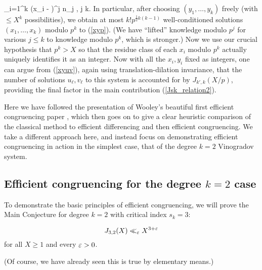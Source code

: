 \documentclass[brochure,english,12pt]{bourbaki}%
\begin{document}
\beq\label{p_classical} 
\sum_{i=1}^k (x_i - \xi)^j \con n_j ,  \leq j \leq k.
\eeq
In particular, after choosing $(y_1,\ldots, y_k)$ freely (with $ \leq X^k$ possibilities), we obtain at most $k! p^{\frac{1}{2}k(k-1)}$ well-conditioned solutions $(x_1,\ldots, x_k)$ modulo $p^k$ to (\ref{xyp}). (We have ``lifted'' knowledge modulo $p^j$ for various $j \leq k$ to knowledge modulo $p^k$, which is stronger.) Now we use our crucial hypothesis that $p^k >X$ so that the residue class of each $x_i$ modulo $p^k$ actually uniquely identifies it as an integer. 
Now with all the $x_i,y_i$ fixed as integers, one can argue from (\ref{xyuv}), again using translation-dilation invariance, that the number of solutions $u_\ell,v_\ell$ to this system is accounted for by $J_{k',k}(X/p)$, providing the final factor in the main contribution (\ref{Jsk_relation2}).





Here we have followed the presentation of Wooley's beautiful first efficient congruencing paper \cite{Woo12a}, which then goes on to give a clear heuristic comparison of the classical method to efficient differencing and then efficient congruencing. We take a different approach here, and instead focus on demonstrating efficient congruencing in action in the simplest case, that of the degree $k=2$ Vinogradov system.

\subsection{Efficient congruencing for the degree $k=2$ case}\label{sec_EC_k2}
To demonstrate the basic principles of efficient congruencing, we will prove the Main Conjecture for degree $k=2$ with critical index $s_k=3$:
\begin{theo}[Main Conjecture for $k=2$]\label{thm_MC_k2_EC}
\[ J_{3,2}(X) \ll_\varepsilon X^{3+\varepsilon} \]
for all $X \geq 1$ and every $\varepsilon>0$.
\end{theo}
(Of course, we have already seen this is true by elementary means.) 


 
\end{document}
